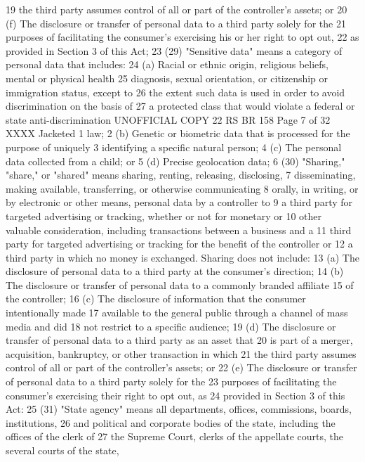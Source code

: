 19 the third party assumes control of all or part of the controller's assets; or
20 (f) The disclosure or transfer of personal data to a third party solely for the
21 purposes of facilitating the consumer's exercising his or her right to opt out,
22 as provided in Section 3 of this Act;
23 (29) "Sensitive data" means a category of personal data that includes:
24 (a) Racial or ethnic origin, religious beliefs, mental or physical health
25 diagnosis, sexual orientation, or citizenship or immigration status, except to
26 the extent such data is used in order to avoid discrimination on the basis of
27 a protected class that would violate a federal or state anti-discrimination 
UNOFFICIAL COPY 22 RS BR 158
Page 7 of 32
XXXX Jacketed
1 law;
2 (b) Genetic or biometric data that is processed for the purpose of uniquely
3 identifying a specific natural person;
4 (c) The personal data collected from a child; or
5 (d) Precise geolocation data;
6 (30) "Sharing," "share," or "shared" means sharing, renting, releasing, disclosing,
7 disseminating, making available, transferring, or otherwise communicating
8 orally, in writing, or by electronic or other means, personal data by a controller to
9 a third party for targeted advertising or tracking, whether or not for monetary or
10 other valuable consideration, including transactions between a business and a
11 third party for targeted advertising or tracking for the benefit of the controller or
12 a third party in which no money is exchanged. Sharing does not include:
13 (a) The disclosure of personal data to a third party at the consumer's direction;
14 (b) The disclosure or transfer of personal data to a commonly branded affiliate
15 of the controller;
16 (c) The disclosure of information that the consumer intentionally made
17 available to the general public through a channel of mass media and did
18 not restrict to a specific audience;
19 (d) The disclosure or transfer of personal data to a third party as an asset that
20 is part of a merger, acquisition, bankruptcy, or other transaction in which
21 the third party assumes control of all or part of the controller's assets; or
22 (e) The disclosure or transfer of personal data to a third party solely for the
23 purposes of facilitating the consumer's exercising their right to opt out, as
24 provided in Section 3 of this Act:
25 (31) "State agency" means all departments, offices, commissions, boards, institutions,
26 and political and corporate bodies of the state, including the offices of the clerk of
27 the Supreme Court, clerks of the appellate courts, the several courts of the state, 
